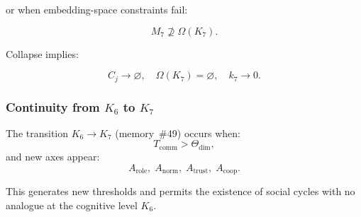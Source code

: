or when embedding-space constraints fail:

\[
 M_7 \not\supseteq \Omega(K_7).
\]

Collapse implies:

\[
 C_j \to \varnothing,\quad
 \Omega(K_7)=\varnothing,\quad
 k_7\to 0.
\]

\subsubsection{Continuity from \texorpdfstring{$K_6$}{K_6} to \texorpdfstring{$K_7$}{K_7}}

The transition $K_6\to K_7$ (memory~\#49) occurs when:
\[
  T_{\mathrm{comm}} > \Theta_{\mathrm{dim}},
\]
and new axes appear:
\[
  A_{\mathrm{role}},\;
  A_{\mathrm{norm}},\;
  A_{\mathrm{trust}},\;
  A_{\mathrm{coop}}.
\]

This generates new thresholds and permits the existence of social cycles
with no analogue at the cognitive level $K_6$.

